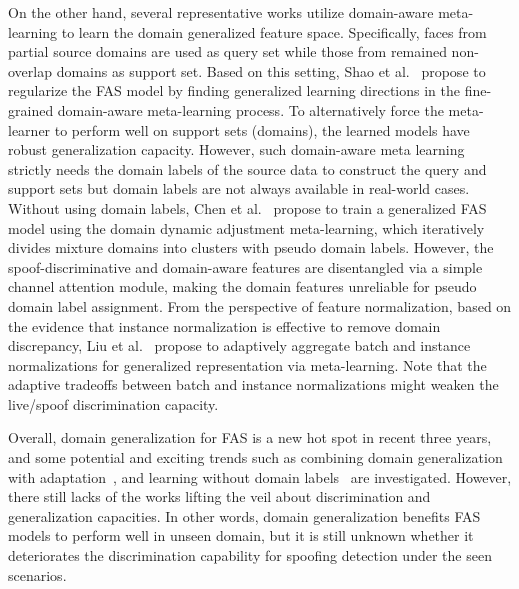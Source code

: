 \documentclass[10pt,journal,compsoc]{IEEEtran}
\begin{document}
On the other hand, several representative works utilize domain-aware meta-learning to learn the domain generalized feature space. Specifically, faces from partial source domains are used as query set while those from remained non-overlap domains as support set. Based on this setting, Shao et al.~\cite{shao2019regularized} propose to regularize the FAS model by finding generalized learning directions in the fine-grained domain-aware meta-learning process. To alternatively force the meta-learner to perform well on support sets (domains), the learned models have robust generalization capacity. However, such domain-aware meta learning strictly needs the domain labels of the source data to construct the query and support sets but domain labels are not always available in real-world cases. Without using domain labels, Chen et al.~\cite{chen2021generalized} propose to train a generalized FAS model using the domain dynamic adjustment meta-learning, which iteratively divides mixture domains into clusters with pseudo domain labels. However, the spoof-discriminative and domain-aware features are disentangled via a simple channel attention module, making the domain features unreliable for pseudo domain label assignment. From the perspective of feature normalization, based on the evidence that instance normalization is effective to remove domain discrepancy, Liu et al.~\cite{liu2021adaptive} propose to adaptively aggregate batch and instance normalizations for generalized representation via meta-learning. Note that the adaptive tradeoffs between batch and instance normalizations might weaken the live/spoof discrimination capacity.


Overall, domain generalization for FAS is a new hot spot in recent three years, and some potential and exciting trends such as combining domain generalization with adaptation~\cite{wang2021self}, and learning without domain labels~\cite{chen2021generalized} are investigated. However, there still lacks of the works lifting the veil about discrimination and generalization capacities. In other words, domain generalization benefits FAS models to perform well in unseen domain, but it is still unknown whether it deteriorates the discrimination capability for spoofing detection under the seen scenarios.
\end{document}
